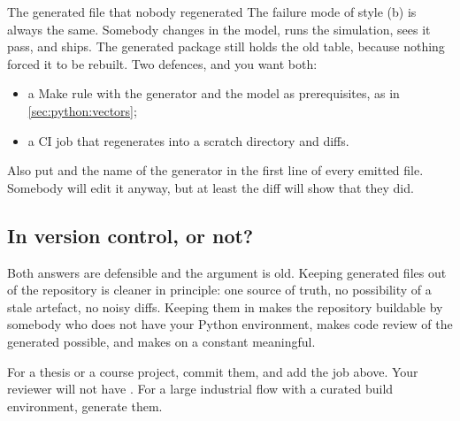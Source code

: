 \begin{gotcha}{The generated file that nobody regenerated}
The failure mode of style (b) is always the same. Somebody changes 
in the model, runs the simulation, sees it pass, and ships. The generated
package still holds the old table, because nothing forced it to be rebuilt.
Two defences, and you want both:
\begin{itemize}
\item a Make rule with the generator and the model as prerequisites, as in
      \cref{sec:python:vectors};
\item a CI job that regenerates into a scratch directory and diffs.
\end{itemize}
Also put  and the name of the generator in the
first line of every emitted file. Somebody will edit it anyway, but at least
the diff will show that they did.
\end{gotcha}

\subsection{In version control, or not?}

Both answers are defensible and the argument is old. Keeping generated files
out of the repository is cleaner in principle: one source of truth, no
possibility of a stale artefact, no noisy diffs. Keeping them in makes the
repository buildable by somebody who does not have your Python environment,
makes code review of the generated \RTL{} possible, and makes \code{git
blame} on a constant meaningful.

For a thesis or a course project, commit them, and add the 
job above. Your reviewer will not have \code{jinja2}. For a large industrial
flow with a curated build environment, generate them.

